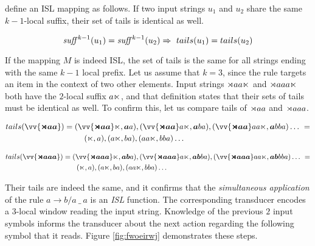 \cite{ChandleeEtAl2014} define an ISL mapping as follows.
If two input strings $u_1$ and $u_2$ share the same $k-1$-local suffix, their set of tails is identical as well.

\[
	\textrm{\emph{suff}}^{k-1}(u_1) = \textrm{\emph{suff}}^{k-1}(u_2) \Rightarrow~ tails(u_1) = tails(u_2)
\]

If the mapping $M$ is indeed ISL, the set of tails is the same for all strings ending with the same $k-1$ local prefix.
Let us assume that $k=3$, since the rule targets an item in the context of two other elements.
Input strings $\rtimes aa\ltimes$ and $\rtimes aaa\ltimes$ both have the $2$-local suffix $a\ltimes$, and that definition states that their sets of tails must be identical as well.
To confirm this, let us compare tails of $\rtimes aa$ and $\rtimes aaa$.


\begin{multline*}
tails(\vv{\bm{\bow aa}}) = (\vv{\bm{\bow aa}}\eow, \bm{a}a), (\vv{\bm{\bow aa}}a\eow, \bm{a}ba), (\vv{\bm{\bow aa}}aa\eow, \bm{a}bba) \dots~ =  \\
 \qquad\qquad\qquad\qquad\quad \shoveleft{(\eow, a), (a\eow, ba), (aa\eow, bba) \dots}
\end{multline*}

\begin{multline*}
tails(\vv{\bm{\bow aaa}}) = (\vv{\bm{\bow aaa}}\eow, \bm{ab}a), (\vv{\bm{\bow aaa}}a\eow, \bm{ab}ba), (\vv{\bm{\bow aaa}}aa\eow, \bm{ab}bba) \dots~ =  \\
 \qquad\qquad\qquad\qquad\quad \shoveleft{(\eow, a), (a\eow, ba), (aa\eow, bba) \dots}
\end{multline*}

Their tails are indeed the same, and it confirms that the \emph{simultaneous application} of the rule $a \rightarrow b / a~ \_~ a$ is an \emph{ISL} function.
The corresponding transducer encodes a $3$-local window reading the input string.
Knowledge of the previous $2$ input symbols informs the transducer about the next action regarding the following symbol that it reads.
Figure \ref{fig:fwoeirwj} demonstrates these steps.

